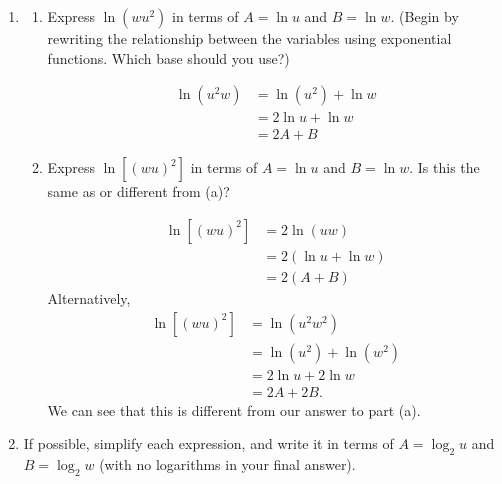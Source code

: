 \documentclass{article}
\begin{document}
\begin{enumerate}[resume]
\item 

  \begin{enumerate}
  \item
    \begin{problem}[\vfill]
      Express $\ln(w u^2)$ in terms of $A = \ln u$ and $B = \ln w$. (Begin by rewriting the relationship between the variables using exponential functions. Which base should you use?)
    \end{problem}

    \begin{solution}
      \begin{align*}
        \ln \left( u^2 w \right) &= \ln \left( u^2 \right) + \ln w \\
        &= 2 \ln u + \ln w \\
        &= \boxed{2A + B}
      \end{align*}
    \end{solution}

  \item
    \begin{problem}[\vfill]
      Express $\ln \left[ (wu)^2 \right]$ in terms of $A = \ln u$ and $B = \ln w$. Is this the same as or different from (a)?
    \end{problem}

    \begin{solution}
    \begin{align*}
          \ln \left[ (wu)^2 \right] &= 2\ln\left(uw\right) \\
          &= 2(\ln u + \ln w )\\
          &= \boxed{2(A + B)}
      \end{align*}
      Alternatively,
      \begin{align*}
          \ln \left[ (wu)^2 \right] &= \ln\left(u^2 w^2\right) \\
          &= \ln(u^2) + \ln (w^2) \\
          &= 2\ln u + 2\ln w \\
          &= 2A + 2B.
      \end{align*}
      We can see that this is different from our answer to part (a).
    \end{solution}

  \end{enumerate}

\item  If possible, simplify each expression, and write it in terms of $A =
  \log_2 u$ and $B = \log_2 w$ (with no logarithms in your final answer). 


\end{enumerate}
\end{document}
